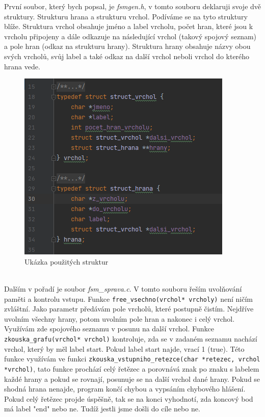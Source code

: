 \documentclass[czech,SP]{thesiskiv}
\begin{document}
{První soubor, který bych popsal, je \textit{fsmgen.h}, v tomto souboru deklaruji svoje dvě struktury. Strukturu hrana a strukturu vrchol. Podíváme se na tyto struktury blíže. Struktura vrchol obsahuje jméno a label vrcholu, počet hran, které jsou k vrcholu připojeny a dále odkazuje na následující vrchol (takový spojový seznam) a pole hran (odkaz na strukturu hrany). Struktura hrany obsahuje názvy obou svých vrcholů, svůj label a také odkaz na další vrchol neboli vrchol do kterého hrana vede.}
\begin{figure}[!ht]
\centering
\includegraphics[width=\textwidth]{struct.png} 
\caption{Ukázka použitých struktur}
\label{struct}
\end{figure}
\\{Dalším v pořadí je soubor \textit{fsm\_sprava.c}. V tomto souboru řeším uvolňování paměti a kontrolu vstupu. Funkce \texttt{free\_vsechno(vrchol* vrcholy)} není ničím zvláštní. Jako parametr předávám pole vrcholů, které postupně čistím. Nejdříve uvolním všechny hrany, potom uvolním pole hran a nakonec i celý vrchol. Využívám zde spojového seznamu v posunu na další vrchol. Funkce \texttt{zkouska\_grafu(vrchol* vrchol)} kontroluje, zda se v zadaném seznamu nachází vrchol, který by měl label start. Pokud label start najde, vrací 1 (true). Této funkce využívám ve funkci \texttt{zkouska\_vstupniho\_retezce(char *retezec, vrchol *vrchol)}, tato funkce prochází celý řetězec a porovnává znak po znaku s labelem každé hrany a pokud se rovnají, posunuje se na další vrchol dané hrany. Pokud se shodná hrana nenajde, program končí chybou a vypsáním chybového hlášení. Pokud celý řetězec projde úspěšně, tak se na konci vyhodnotí, zda koncový bod má label "end" nebo ne. Tudíž jestli jsme došli do cíle nebo ne.}\\
\end{document}
